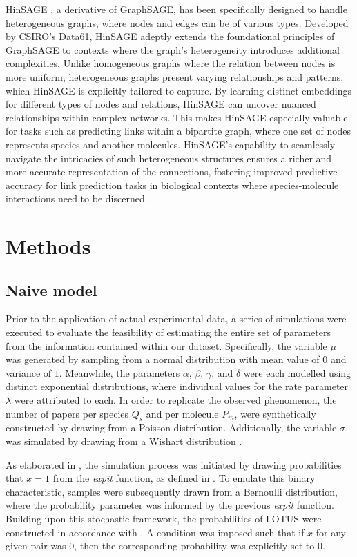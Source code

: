 \documentclass[
11pt, %
oneside, %
english, %
singlespacing, %
headsepline, %
chapterinoneline, %
]{MastersDoctoralThesis} %
\begin{document}
HinSAGE \cite{StellarGraphMachineLearning2018}, a derivative of GraphSAGE, has been specifically designed to handle heterogeneous graphs, where nodes and edges can be of various types. Developed by CSIRO's Data61, HinSAGE adeptly extends the foundational principles of GraphSAGE to contexts where the graph's heterogeneity introduces additional complexities. Unlike homogeneous graphs where the relation between nodes is more uniform, heterogeneous graphs present varying relationships and patterns, which HinSAGE is explicitly tailored to capture. By learning distinct embeddings for different types of nodes and relations, HinSAGE can uncover nuanced relationships within complex networks. This makes HinSAGE especially valuable for tasks such as predicting links within a bipartite graph, where one set of nodes represents species and another molecules. HinSAGE's capability to seamlessly navigate the intricacies of such heterogeneous structures ensures a richer and more accurate representation of the connections, fostering improved predictive accuracy for link prediction tasks in biological contexts where species-molecule interactions need to be discerned.

\chapter{Methods}\label{chap:Methods}
\section{Naive model}
Prior to the application of actual experimental data, a series of simulations were executed to evaluate the feasibility of estimating the entire set of parameters from the information contained within our dataset. Specifically, the variable $\mu$ was generated by sampling from a normal distribution with mean value of $0$ and variance of $1$. Meanwhile, the parameters $\alpha$, $\beta$, $\gamma$, and $\delta$ were each modelled using distinct exponential distributions, where individual values for the rate parameter $\lambda$ were attributed to each. In order to replicate the observed phenomenon, the number of papers per species $Q_s$ and per molecule $P_m$, were synthetically constructed by drawing from a Poisson distribution. Additionally, the variable $\sigma$ was simulated by drawing from a Wishart distribution \cite{wishartGENERALISEDPRODUCTMOMENT1928}.

As elaborated in , the simulation process was initiated by drawing probabilities that $x=1$ from the \textit{expit} function, as defined in . 
To emulate this binary characteristic, samples were subsequently drawn from a Bernoulli distribution, where the probability parameter was informed by the previous \textit{expit} function. Building upon this stochastic framework, the probabilities of LOTUS were constructed in accordance with . A  condition was imposed such that if $x$ for any given pair was $0$, then the corresponding probability was explicitly set to $0$.
\end{document}
